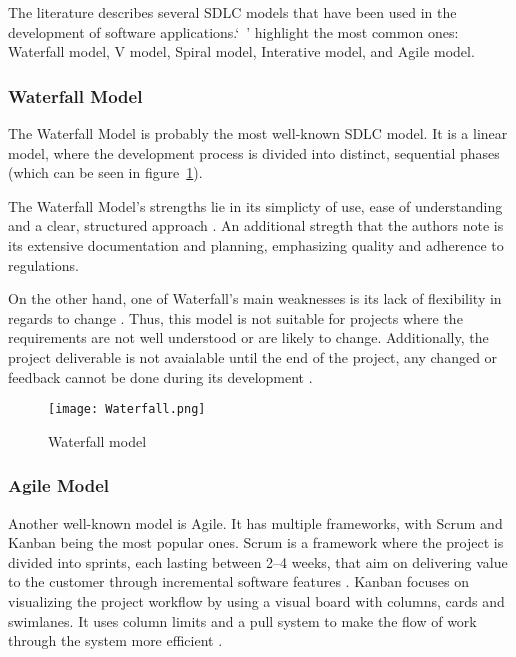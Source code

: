 The literature describes several SDLC models that have been used in the development of software applications.`\ '\textcite{sdlc1, sdlc2} highlight the most common ones: Waterfall model, V model, Spiral model, Interative model, and Agile model.

\subsubsection{Waterfall Model}

The Waterfall Model is probably the most well-known SDLC model. It is a linear model, where the development process is divided into distinct, sequential phases (which can be seen in figure~\ref{fig:waterfall}).

The Waterfall Model's strengths lie in its simplicty of use, ease of understanding and a clear, structured approach \parencite{waterfall}. An additional stregth that the authors note is its extensive documentation and planning, emphasizing quality and adherence to regulations. 

On the other hand, one of Waterfall's main weaknesses is its lack of flexibility in regards to change \parencite{waterfallno}. Thus, this model is not suitable for projects where the requirements are not well understood or are likely to change. Additionally, the project deliverable is not avaialable until the end of the project, any changed or feedback cannot be done during its development \parencite{waterfallno}.

\begin{figure}[ht]
    \centering
    \texttt{[image: Waterfall.png]}
    \caption{Waterfall model}\label{fig:waterfall}
\end{figure}

\subsubsection{Agile Model}

Another well-known model is Agile. It has multiple frameworks, with Scrum and Kanban being the most popular ones. Scrum is a framework where the project is divided into sprints, each lasting between 2--4 weeks, that aim on delivering value to the customer through incremental software features \parencite{scrumban, agile}. Kanban focuses on visualizing the project workflow by using a visual board with columns, cards and swimlanes. It uses column limits and a pull system to make the flow of work through the system more efficient \parencite{agile}.

